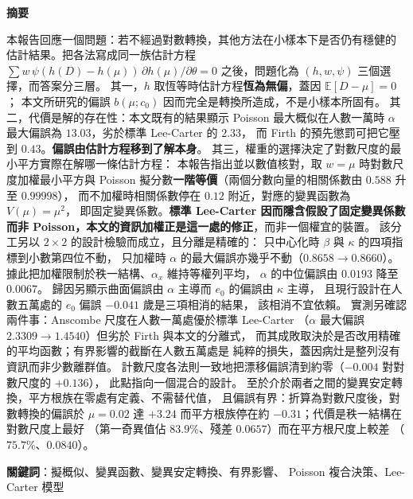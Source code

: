 \documentclass[UTF8, fontset=macnew, a4paper, 12pt]{ctexart}
\newcommand{\Ex}{\mathbb{E}}
\begin{document}
\vspace{6pt}
\begin{center}
\begin{minipage}{0.92\textwidth}
\small
\textbf{摘要}\par\vspace{4pt}
本報告回應一個問題：若不經過對數轉換，其他方法在小樣本下是否仍有穩健的
估計結果。把各法寫成同一族估計方程
$\sum w\,\psi(h(D)-h(\mu))\,\partial h(\mu)/\partial\theta=0$
之後，問題化為 $(h,w,\psi)$ 三個選擇，而答案分三層。
其一，$h$ 取恆等時估計方程\textbf{恆為無偏}，蓋因 $\Ex[D-\mu]=0$；
本文所研究的偏誤 $b(\mu;c_0)$ 因而完全是轉換所造成，不是小樣本所固有。
其二，代價是解的存在性：本文既有的結果顯示 Poisson 最大概似在人數一萬時
$\alpha$ 最大偏誤為 $13.03$，劣於標準 Lee-Carter 的 $2.33$，
而 Firth 的預先懲罰可把它壓到 $0.43$。\textbf{偏誤由估計方程移到了解本身}。
其三，權重的選擇決定了對數尺度的最小平方實際在解哪一條估計方程：
本報告指出並以數值核對，取 $w=\mu$ 時對數尺度加權最小平方與 Poisson
擬分數\textbf{一階等價}（兩個分數向量的相關係數由 $0.588$ 升至 $0.99998$），
而不加權時相關係數停在 $0.12$ 附近，對應的變異函數為 $V(\mu)=\mu^2$，
即固定變異係數。\textbf{標準 Lee-Carter 因而隱含假設了固定變異係數而非
Poisson，本文的資訊加權正是這一處的修正}，而非一個權宜的裝置。
該分工另以 $2\times2$ 的設計檢驗而成立，且分離是精確的：
只中心化時 $\beta$ 與 $\kappa$ 的四項指標到小數第四位不動，
只加權時 $\alpha$ 的最大偏誤亦幾乎不動（$0.8658\to0.8660$）。
據此把加權限制於秩一結構、$\alpha_x$ 維持等權列平均，
$\alpha$ 的中位偏誤由 $0.0193$ 降至 $0.0067$。
歸因另顯示曲面偏誤由 $\alpha$ 主導而 $e_0$ 的偏誤由 $\kappa$ 主導，
且現行設計在人數五萬處的 $e_0$ 偏誤 $-0.041$ 歲是三項相消的結果，
該相消不宜依賴。
實測另確認兩件事：Anscombe 尺度在人數一萬處優於標準 Lee-Carter
（$\alpha$ 最大偏誤 $2.3309\to1.4540$）但劣於 Firth 與本文的分離式，
而其成敗取決於是否改用精確的平均函數；有界影響的截斷在人數五萬處是
純粹的損失，蓋因病灶是整列沒有資訊而非少數離群值。
計數尺度各法則一致地把漂移偏誤清到約零（$-0.004$ 對對數尺度的 $+0.136$），
此點指向一個混合的設計。
至於介於兩者之間的變異安定轉換，平方根族在零處有定義、不需替代值，
且偏誤有界：折算為對數尺度後，對數轉換的偏誤於 $\mu=0.02$ 達 $+3.24$
而平方根族停在約 $-0.31$；代價是秩一結構在對數尺度上最好
（第一奇異值佔 $83.9\%$、殘差 $0.0657$）而在平方根尺度上較差
（$75.7\%$、$0.0840$）。
\par\vspace{6pt}
\textbf{關鍵詞}：擬概似、變異函數、變異安定轉換、有界影響、
Poisson 複合決策、Lee-Carter 模型
\end{minipage}
\end{center}
\end{document}
